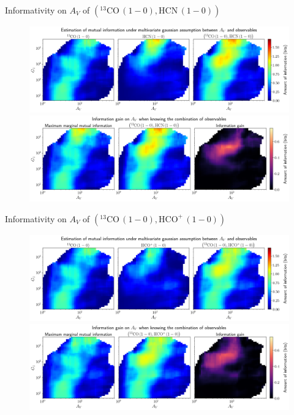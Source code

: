 \documentclass{beamer}
\begin{document}
\begin{frame}{Informativity on $A_V$ of $\left(\mathrm{^{13}CO\,(1-0)},\mathrm{HCN\,(1-0)}\right)$}
    \begin{figure}
        \centering
        \includegraphics[width=0.95\linewidth]{../linearinfogauss/av__13co10_hcn10_linearinfogauss.png}
        \vfill
        \includegraphics[width=0.95\linewidth]{../linearinfogauss/av__13co10_hcn10_linearinfogauss_gain.png}
    \end{figure}
\end{frame}

\begin{frame}{Informativity on $A_V$ of $\left(\mathrm{^{13}CO\,(1-0)},\mathrm{HCO^+\,(1-0)}\right)$}
    \begin{figure}
        \centering
        \includegraphics[width=0.95\linewidth]{../linearinfogauss/av__13co10_hcop10_linearinfogauss.png}
        \vfill
        \includegraphics[width=0.95\linewidth]{../linearinfogauss/av__13co10_hcop10_linearinfogauss_gain.png}
    \end{figure}
\end{frame}
\end{document}
